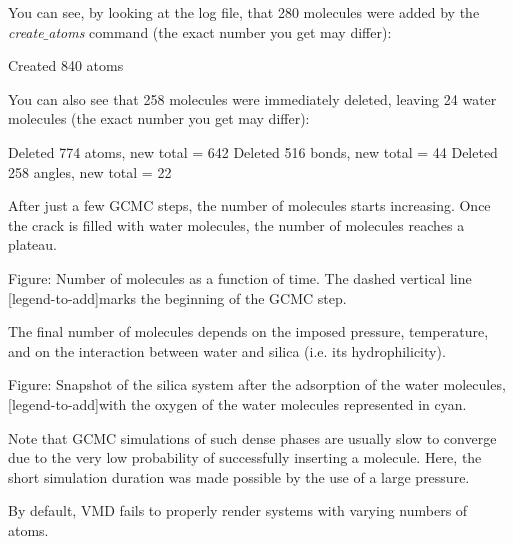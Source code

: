 \vspace{0.25cm} \noindent You can see, by looking at the log file, that 280 molecules
were added by the \textit{create$\_$atoms} command (the exact number you get may differ):

\begin{lcverbatim}
Created 840 atoms
\end{lcverbatim}

\noindent You can also see that 258 molecules were immediately deleted,
leaving 24 water molecules (the exact number you get may differ):

\begin{lcverbatim}
Deleted 774 atoms, new total = 642
Deleted 516 bonds, new total = 44
Deleted 258 angles, new total = 22
\end{lcverbatim}

\noindent After just a few GCMC steps,
the number of molecules starts increasing.
Once the crack is filled with water molecules, the number of
molecules reaches a plateau.

\vspace{0.25cm} Figure: Number of molecules as a function of time. The dashed vertical line
[legend-to-add]marks the beginning of the GCMC step.

\vspace{0.25cm} \noindent The final number of molecules depends on the imposed pressure, 
temperature, and on the interaction between water and silica (i.e. its hydrophilicity). 

\vspace{0.25cm} Figure: Snapshot of the silica system after the adsorption of the water molecules,
[legend-to-add]with the oxygen of the water molecules represented in cyan.

\vspace{0.25cm} \noindent Note that GCMC simulations of such dense phases are usually slow to converge due to the
very low probability of successfully inserting a molecule. Here, the short simulation 
duration was made possible by the use of a large pressure.

\begin{tcolorbox}[colback=mylightblue!5!white,colframe=mylightblue!75!black,title=Vizualising varying number of molecules]

\vspace{0.25cm} \noindent By default, VMD fails to properly render systems with varying numbers of atoms.
\end{tcolorbox}

